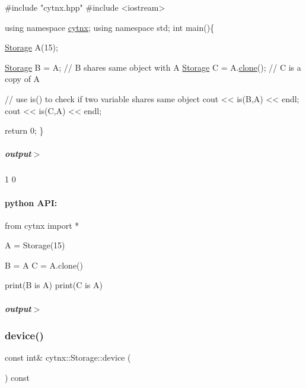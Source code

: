 \begin{DoxyCodeInclude}
\textcolor{preprocessor}{#include "cytnx.hpp"}
\textcolor{preprocessor}{#include <iostream>}


\textcolor{keyword}{using namespace }\hyperlink{namespacecytnx}{cytnx};
\textcolor{keyword}{using namespace }std;
\textcolor{keywordtype}{int} main()\{ 

    \hyperlink{classcytnx_1_1Storage}{Storage} A(15);

    \hyperlink{classcytnx_1_1Storage}{Storage} B = A; \textcolor{comment}{// B shares same object with A}
    \hyperlink{classcytnx_1_1Storage}{Storage} C = A.\hyperlink{classcytnx_1_1Storage_aed0530dd20f3fb352d45653ba46a3d50}{clone}(); \textcolor{comment}{// C is a copy of A}
    
    \textcolor{comment}{// use is() to check if two variable shares same object}
    cout << is(B,A) << endl;
    cout << is(C,A) << endl;

    \textcolor{keywordflow}{return} 0;
\}

\end{DoxyCodeInclude}
 \subparagraph*{output$>$}


\begin{DoxyVerbInclude}
1
0
\end{DoxyVerbInclude}
 \paragraph*{python A\+PI\+:}


\begin{DoxyCodeInclude}
\textcolor{keyword}{from} cytnx \textcolor{keyword}{import} *

A = Storage(15)

B = A
C = A.clone()

print(B \textcolor{keywordflow}{is} A)
print(C \textcolor{keywordflow}{is} A)

\end{DoxyCodeInclude}
 \subparagraph*{output$>$}


\begin{DoxyVerbInclude}
\end{DoxyVerbInclude}
 \mbox{\label{classcytnx_1_1Storage_a4c3e27582d7f951e6b76ccbb92f7c537}} 
\subsubsection{\texorpdfstring{device()}{device()}}
{\footnotesize\ttfamily const int\& cytnx\+::\+Storage\+::device (\begin{DoxyParamCaption}{ }\end{DoxyParamCaption}) const\hspace{0.3cm}{\ttfamily [inline]}}



